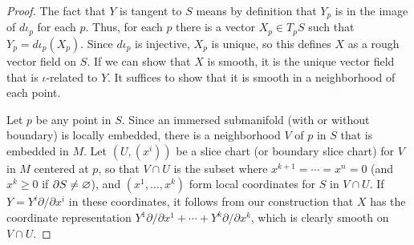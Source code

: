 \begin{proof}
The fact that $Y$ is tangent to $S$ means by definition that $Y_p$ is in the image of $d\iota_p$ for each $p$. Thus, for each $p$ there is a vector $X_p\in T_pS$ such that $Y_p=d\iota_p(X_p)$. Since $d\iota_p$ is injective, $X_p$ is unique, so this defines $X$ as a rough vector field on $S$. If we can show that $X$ is smooth, it is the unique vector field that is $\iota$-related to $Y$. It suffices to show that it is smooth in a neighborhood of each point.\par
Let $p$ be any point in $S$. Since an immersed submanifold (with or without boundary) is locally embedded, there is a neighborhood $V$ of $p$ in $S$ that is embedded
in $M$. Let $(U,(x^i))$ be a slice chart (or boundary slice chart) for $V$ in $M$ centered at $p$, so that $V\cap U$ is the subset where $x^{k+1}=\cdots=x^n=0$ (and $x^k\geq 0$ if $\partial S\neq\varnothing$), and $(x^1,\dots,x^k)$ form local coordinates for $S$ in $V\cap U$. If $Y=Y^i\partial/\partial x^i$ in these coordinates, it follows from our construction that $X$ has the coordinate representation $Y^1\partial/\partial x^1+\cdots+Y^k\partial/\partial x^k$, which is clearly smooth on $V\cap U$.
\end{proof}
